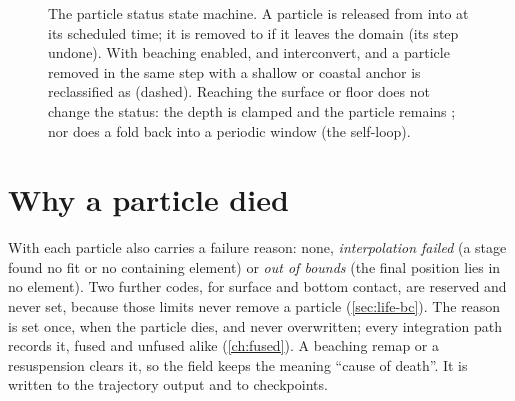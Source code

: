 \begin{figure}[t]
\centering
{}
\caption{The particle status state machine. A particle is released from  into
 at its scheduled time; it is removed to  if it leaves the domain (its step undone).
With beaching enabled,  and  interconvert, and a particle removed in the same step
with a shallow or coastal anchor is reclassified as  (dashed). Reaching the surface or floor
does not change the status: the depth is clamped and the particle remains ; nor does a fold back
into a periodic window (the self-loop).}
\label{fig:lifecycle}
\end{figure}

\section{Why a particle died}\label{sec:life-reason}

With  each particle also carries a failure reason: none,
\emph{interpolation failed} (a stage found no fit or no containing element) or \emph{out of bounds} (the final
position lies in no element). Two further codes, for surface and bottom contact, are reserved and never set,
because those limits never remove a particle (\cref{sec:life-bc}). The reason is set once, when the particle
dies, and never overwritten; every integration path records it, fused and unfused alike (\cref{ch:fused}). A
beaching remap or a resuspension clears it, so the field keeps the meaning ``cause of death''. It is written
to the trajectory output and to checkpoints.

